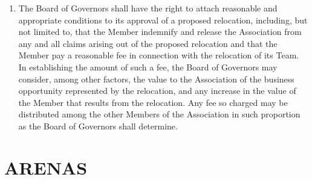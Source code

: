 \documentclass[]{book}
\begin{document}
\begin{enumerate}
\item
  The Board of Governors shall have the right to attach reasonable and appropriate conditions to its approval of a proposed relocation, including, but not limited to, that the Member indemnify and release the Association from any and all claims arising out of the proposed relocation and that the Member pay a reasonable fee in connection with the relocation of its Team. In establishing the amount of such a fee, the Board of Governors may consider, among other factors, the value to the Association of the business opportunity represented by the relocation, and any increase in the value of the Member that results from the relocation. Any fee so charged may be distributed among the other Members of the Association in such proportion as the Board of Governors shall determine.
\end{enumerate}

\hypertarget{arenas}{%
\section{ARENAS}\label{arenas}}
\end{document}
